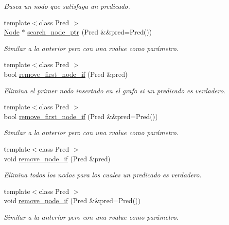 \begin{DoxyCompactItemize}
\begin{DoxyCompactList}\small\item\em Busca un nodo que satisfaga un predicado. \end{DoxyCompactList}\item 
{\footnotesize template$<$class Pred $>$ }\\\hyperlink{namespace_designar_a5af326c65aa2bd26b26c410f2030d09e}{Node} $\ast$ \hyperlink{class_designar_1_1_base_graph_af19f6876395f82edc748b8c7ec7413f8}{search\+\_\+node\+\_\+ptr} (Pred \&\&pred=Pred())
\begin{DoxyCompactList}\small\item\em Similar a la anterior pero con una rvalue como parámetro. \end{DoxyCompactList}\item 
{\footnotesize template$<$class Pred $>$ }\\bool \hyperlink{class_designar_1_1_base_graph_a1311af417ba4d373d7051b73cc2696ec}{remove\+\_\+first\+\_\+node\+\_\+if} (Pred \&pred)
\begin{DoxyCompactList}\small\item\em Elimina el primer nodo insertado en el grafo si un predicado es verdadero. \end{DoxyCompactList}\item 
{\footnotesize template$<$class Pred $>$ }\\bool \hyperlink{class_designar_1_1_base_graph_aec049416b5240910cb04b1d6f55fcecf}{remove\+\_\+first\+\_\+node\+\_\+if} (Pred \&\&pred=Pred())
\begin{DoxyCompactList}\small\item\em Similar a la anterior pero con una rvalue como parámetro. \end{DoxyCompactList}\item 
{\footnotesize template$<$class Pred $>$ }\\void \hyperlink{class_designar_1_1_base_graph_aae56ca6b3b936835d07275f2ceb4b0d1}{remove\+\_\+node\+\_\+if} (Pred \&pred)
\begin{DoxyCompactList}\small\item\em Elimina todos los nodos para los cuales un predicado es verdadero. \end{DoxyCompactList}\item 
{\footnotesize template$<$class Pred $>$ }\\void \hyperlink{class_designar_1_1_base_graph_a6e63659d272255254f6abc29c1e09724}{remove\+\_\+node\+\_\+if} (Pred \&\&pred=Pred())
\begin{DoxyCompactList}\small\item\em Similar a la anterior pero con una rvalue como parámetro. \end{DoxyCompactList}\item 

\end{DoxyCompactItemize}
